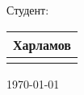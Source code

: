 \documentclass{article}
\makeatletter
\newcommand{\handplaceholder}[3]{
    \bgroup
      \renewcommand*{\arraystretch}{0}
      \begin{tabular}{@{}>{\centering\arraybackslash}p{#1}@{}}
        #2 \\
        \hline
        {\scriptsize #3}
      \end{tabular}
    \egroup
  }
\makeatother
\begin{document}
  Студент: \handplaceholder{3cm}{Харламов}{Фамилия} \hfill \today
\end{document}
